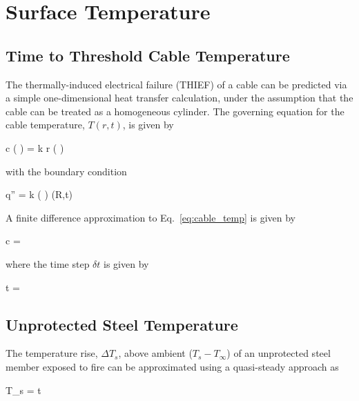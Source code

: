
\chapter{Surface Temperature}
\label{Surface_Temperature_Chapter}

\section{Time to Threshold Cable Temperature}

The thermally-induced electrical failure (THIEF) of a cable can be predicted via a simple
one-dimensional heat transfer calculation, under the assumption that the cable can be
treated as a homogeneous cylinder. The governing equation for the cable temperature,
$T(r,t)$, is given by

\be
\rho c \left(  \right) =   k r \left(  \right)
\label{eq:cable_temp}
\ee

\noindent with the boundary condition

\be
\dot q'' = k \left(  \right) (R,t)
\ee

\noindent A finite difference approximation to Eq.~\ref{eq:cable_temp} is given by

\be
\rho c  =   
\ee

\noindent where the time step $\delta t$ is given by

\be
\delta t = 
\ee


\clearpage


\section{Unprotected Steel Temperature}

The temperature rise, $\Delta T_s$, above ambient ($T_s - T_\infty$) of an unprotected steel member exposed to fire can be approximated using a quasi-steady approach as

\be
\Delta T_s =    \Delta t
\label{eq:unprotected_steel}
\ee

